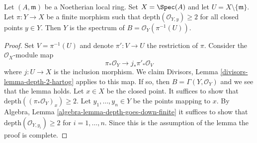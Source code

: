 \begin{lemma}
\label{lemma-sections-over-punctured-spec}
Let $(A, \mathfrak m)$ be a Noetherian local ring. Set $X = \Spec(A)$
and let $U = X \setminus \{\mathfrak m\}$.
Let $\pi : Y \to X$ be a finite morphism such that
$\text{depth}(\mathcal{O}_{Y, y}) \geq 2$ for all closed points
$y \in Y$.
Then $Y$ is the spectrum of $B = \mathcal{O}_Y(\pi^{-1}(U))$.
\end{lemma}

\begin{proof}
Set $V = \pi^{-1}(U)$ and denote $\pi' : V \to U$ the restriction of $\pi$.
Consider the $\mathcal{O}_X$-module map
$$
\pi_*\mathcal{O}_Y \longrightarrow j_*\pi'_*\mathcal{O}_V
$$
where $j : U \to X$ is the inclusion morphism. We claim
Divisors, Lemma \ref{divisors-lemma-depth-2-hartog}
applies to this map. If so, then $B = \Gamma(Y, \mathcal{O}_Y)$
and we see that the lemma holds. Let $x \in X$ be the closed point.
It suffices to show that
$\text{depth}((\pi_*\mathcal{O}_Y)_x) \geq 2$.
Let $y_1, \ldots, y_n \in Y$ be the points mapping to $x$.
By Algebra, Lemma \ref{algebra-lemma-depth-goes-down-finite}
it suffices to show that
$\text{depth}(\mathcal{O}_{Y, y_i}) \geq 2$ for $i = 1, \ldots, n$.
Since this is the assumption of the lemma the proof is complete.
\end{proof}
